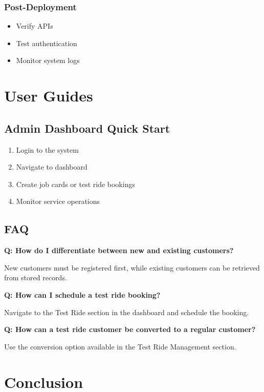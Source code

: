 \documentclass[12pt,a4paper]{report}
\begin{document}
\subsection{Post-Deployment}

\begin{itemize}
\item Verify APIs
\item Test authentication
\item Monitor system logs
\end{itemize}

\chapter{User Guides}

\section{Admin Dashboard Quick Start}

\begin{enumerate}
\item Login to the system
\item Navigate to dashboard
\item Create job cards or test ride bookings
\item Monitor service operations
\end{enumerate}

\section{FAQ}

\textbf{Q: How do I differentiate between new and existing customers?}

New customers must be registered first, while existing customers can be retrieved from stored records.

\textbf{Q: How can I schedule a test ride booking?}

Navigate to the Test Ride section in the dashboard and schedule the booking.

\textbf{Q: How can a test ride customer be converted to a regular customer?}

Use the conversion option available in the Test Ride Management section.

\chapter{Conclusion}
\end{document}
